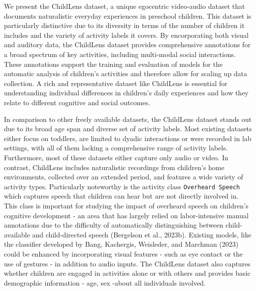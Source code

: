 \documentclass[
  man,floatsintext]{apa6}
\begin{document}
We present the ChildLens dataset, a unique egocentric video-audio dataset that documents naturalistic everyday experiences in preschool children. This dataset is particularly distinctive due to its diversity in terms of the number of children it includes and the variety of activity labels it covers. By encorporating both visual and auditory data, the ChildLens dataset provides comprehensive annotations for a broad spectrum of key activities, including multi-modal social interactions. These annotations support the training and evaluation of models for the automatic analysis of children's activities and therefore allow for scaling up data collection. A rich and representative dataset like ChildLens is essential for understanding individual differences in children's daily experiences and how they relate to different cognitive and social outcomes.

In comparison to other freely available datasets, the ChildLens dataset stands out due to its broad age span and diverse set of activity labels. Most existing datasets either focus on toddlers, are limited to dyadic interactions or were recorded in lab settings, with all of them lacking a comprehensive range of activity labels. Furthermore, most of these datasets either capture only audio or video. In contrast, ChildLens includes naturalistic recordings from children's home environments, collected over an extended period, and features a wide variety of activity types. Particularly noteworthy is the activity class \texttt{Overheard\ Speech} which captures speech that children can hear but are not directly involved in. This class is important for studying the impact of overheard speech on children's cognitive development - an area that has largely relied on labor-intensive manual annotations due to the difficulty of automatically distinguishing between child-available and child-directed speech (Bergelson et al., 2023b). Existing models, like the classifier developed by Bang, Kachergis, Weisleder, and Marchman (2023) could be enhanced by incorporating visual features - such as eye contact or the use of gestures - in addition to audio inputs. The ChildLens dataset also captures whether children are engaged in activities alone or with others and provides basic demographic information - age, sex -about all individuals involved.
\end{document}
